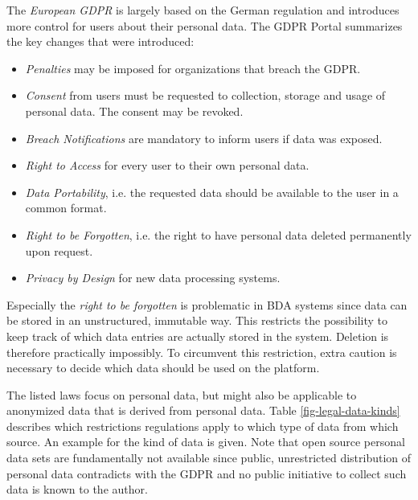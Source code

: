 The \emph{European \ac{GDPR}} is largely based
on the German regulation and introduces more control for users about their personal data.
\autocite{eu2016gdpr}
The \ac{GDPR} Portal \autocite{trunomi2018gdpr} summarizes the key changes that were introduced:
\begin{itemize}
    \item \emph{Penalties} may be imposed for organizations that breach the \ac{GDPR}.
    \item \emph{Consent} from users must be requested to collection, storage and usage of personal data. The consent may be revoked.
    \item \emph{Breach Notifications} are mandatory to inform users if data was exposed.
    \item \emph{Right to Access} for every user to their own personal data.
    \item \emph{Data Portability}, i.e. the requested data should be available to the user in a common format.
    \item \emph{Right to be Forgotten}, i.e. the right to have personal data deleted permanently upon request.
    \item \emph{Privacy by Design} for new data processing systems.
\end{itemize}

Especially the \emph{right to be forgotten} is problematic in \ac{BDA} systems
since data can be stored in an unstructured, immutable way. 
This restricts the possibility to keep track of which data entries are actually stored in the system. Deletion is therefore practically impossibly. 
To circumvent this restriction, extra caution is necessary to decide which data should be used on the platform. 

The listed laws focus on personal data, but might also be applicable to anonymized data that is derived from personal data.
Table \ref{fig-legal-data-kinds} describes which restrictions regulations apply to which type of data from which source. 
An example for the kind of data is given.
Note that open source personal data sets are fundamentally not available 
since public, unrestricted distribution of personal data contradicts with the \ac{GDPR}
and no public initiative to collect such data is known to the author.

